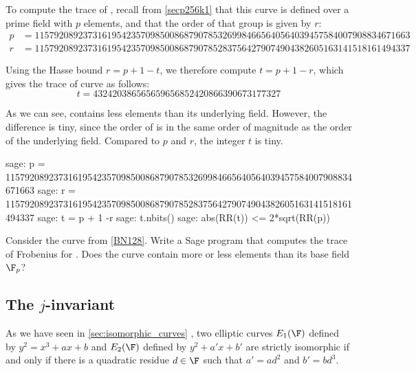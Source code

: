 \begin{example}\label{ex:secp256k1-trace}To compute the trace of , recall from \examplename{} \ref{secp256k1} that this curve is defined over a prime field with $p$ elements, and that the order of that group is given by $r$:  
\begin{align*}
p &= \scriptstyle 115792089237316195423570985008687907853269984665640564039457584007908834671663\\
r &= \scriptstyle 115792089237316195423570985008687907852837564279074904382605163141518161494337
\end{align*}

Using the Hasse bound $r = p + 1 -t$, we therefore compute $t= p+1 -r$, which gives the trace of curve  as follows:
$$
t = \scriptstyle 432420386565659656852420866390673177327
$$

As we can see,  contains less elements than its underlying field. However,  the difference is tiny, since the order of  is in the same order of magnitude as the order of the underlying field. Compared to $p$ and $r$, the integer $t$ is tiny.

\begin{sagecommandline}
sage: p = 115792089237316195423570985008687907853269984665640564039457584007908834671663
sage: r = 115792089237316195423570985008687907852837564279074904382605163141518161494337
sage: t = p + 1 -r
sage: t.nbits()
sage: abs(RR(t)) <= 2*sqrt(RR(p))
\end{sagecommandline}
\end{example} 
\begin{exercise}
\label{exercise:BN128-trace}
Consider the curve  from \examplename{} \ref{BN128}. Write a Sage program that computes the trace of Frobenius for . Does the curve contain more or less elements than its base field $\F_p$?
\end{exercise}

\subsection{The $j$-invariant}
\label{sec:j-inv} As we have seen in \ref{sec:isomorphic_curves} , two elliptic curves $E_1(\F)$ defined by $y^2 = x^3 + ax +b$ and $E_2(\F)$ defined by $y^2 + a'x + b'$ are strictly isomorphic if and only if there is a quadratic residue $d\in \F$ such that $a' = a d^2$ and $b' = b d^3$. 

